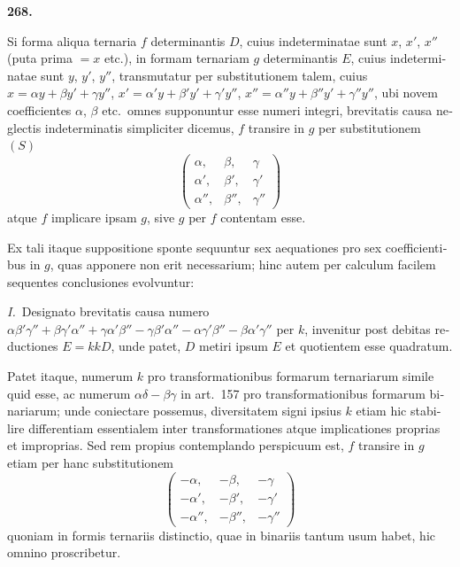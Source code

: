 \documentclass[12pt,a4paper]{article}
\theoremstyle{plain}
\theoremstyle{definition}
\theoremstyle{remark}
\begin{document}
\begin{otherlanguage}{latin}

\textbf{268.}

Si forma aliqua ternaria $f$ determinantis $D$, cuius indeterminatae sunt $x$, $x'$, $x''$ (puta prima $= x$ etc.), in formam ternariam $g$ determinantis $E$, cuius indeterminatae sunt $y$, $y'$, $y''$, transmutatur per substitutionem talem, cuius $x = \alpha y + \beta y' + \gamma y''$, $x' = \alpha' y + \beta' y' + \gamma' y''$, $x'' = \alpha'' y + \beta'' y' + \gamma'' y''$, ubi novem coefficientes $\alpha$, $\beta$ etc.\ omnes supponuntur esse numeri integri, brevitatis causa neglectis indeterminatis simpliciter dicemus, $f$ transire in $g$ per substitutionem $(S)$
\[
\begin{pmatrix} \alpha, & \beta, & \gamma \\ \alpha', & \beta', & \gamma' \\ \alpha'', & \beta'', & \gamma'' \end{pmatrix}
\]
atque $f$ implicare ipsam $g$, sive $g$ per $f$ contentam esse.

Ex tali itaque suppositione sponte sequuntur sex aequationes pro sex coefficientibus in $g$, quas apponere non erit necessarium; hinc autem per calculum facilem sequentes conclusiones evolvuntur:

\textit{I.}\ Designato brevitatis causa numero $\alpha\beta'\gamma'' + \beta\gamma'\alpha'' + \gamma\alpha'\beta'' - \gamma\beta'\alpha'' - \alpha\gamma'\beta'' - \beta\alpha'\gamma''$ per $k$, invenitur post debitas reductiones $E = kkD$, unde patet, $D$ metiri ipsum $E$ et quotientem esse quadratum.

Patet itaque, numerum $k$ pro transformationibus formarum ternariarum simile quid esse, ac numerum $\alpha\delta - \beta\gamma$ in art.\ 157 pro transformationibus formarum binariarum; unde coniectare possemus, diversitatem signi ipsius $k$ etiam hic stabilire differentiam essentialem inter transformationes atque implicationes proprias et improprias. Sed rem propius contemplando perspicuum est, $f$ transire in $g$ etiam per hanc substitutionem
\[
\begin{pmatrix} -\alpha, & -\beta, & -\gamma \\ -\alpha', & -\beta', & -\gamma' \\ -\alpha'', & -\beta'', & -\gamma'' \end{pmatrix}
\]
quoniam in formis ternariis distinctio, quae in binariis tantum usum habet, hic omnino proscribetur.


\end{otherlanguage}
\end{document}
